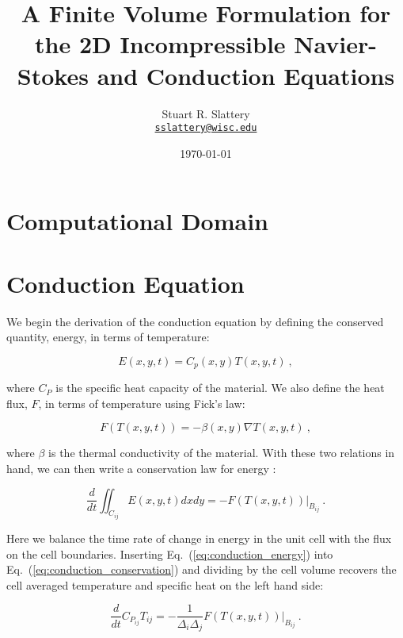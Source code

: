 \documentclass[letterpaper,12pt]{article}
\author{Stuart R. Slattery
\\ \href{mailto:sslattery@wisc.edu}{\texttt{sslattery@wisc.edu}}
}
\date{\today}
\title{A Finite Volume Formulation for the 2D Incompressible
  Navier-Stokes and Conduction Equations}
\begin{document}
\maketitle

\section{Computational Domain}

\section{Conduction Equation}
We begin the derivation of the conduction equation by defining the
conserved quantity, energy, in terms of temperature:

\begin{equation}
  E(x,y,t) = C_p(x,y) T(x,y,t)\:,
  \label{eq:conduction_energy}
\end{equation}

where $C_P$ is the specific heat capacity of the material. We also
define the heat flux, $F$, in terms of temperature using Fick's law:

\begin{equation}
  F(T(x,y,t)) = -\beta(x,y) \nabla T(x,y,t)\:,
  \label{eq:conduction_ficks_law}
\end{equation}

where $\beta$ is the thermal conductivity of the material. With these
two relations in hand, we can then write a conservation law for energy
\cite{leveque_2002}:

\begin{equation}
  \frac{d}{dt} \iint_{C_{ij}} E(x,y,t) dx dy = -F(T(x,y,t)) |_{B_{ij}}\:.
  \label{eq:conduction_conservation}
\end{equation}

Here we balance the time rate of change in energy in the unit cell
with the flux on the cell boundaries. Inserting
Eq.~(\ref{eq:conduction_energy}) into
Eq.~(\ref{eq:conduction_conservation}) and dividing by the cell volume
recovers the cell averaged temperature and specific heat on the left
hand side:

\begin{equation}
  \frac{d}{dt} C_{P_{ij}} T_{ij} = -\frac{1}{\Delta_i
    \Delta_j}F(T(x,y,t)) |_{B_{ij}}\:.
  \label{eq:conduction_cell_averaged}
\end{equation}
\end{document}
